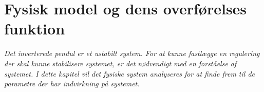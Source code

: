\chapter{Fysisk model og dens overførelses funktion}\label{kap:chap_fysik_reg}

\emph{Det inverterede pendul er et ustabilt system. For at kunne fastlægge en regulering der skal kunne stabilisere systemet, er det nødvendigt med en forståelse af systemet. I dette kapitel vil det fysiske system analyseres for at finde frem til de parametre der har indvirkning på systemet.}

